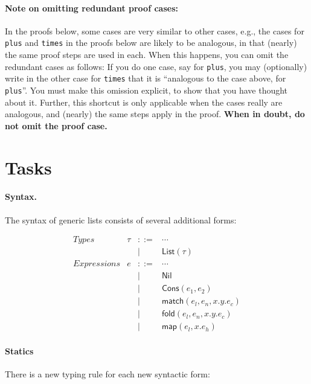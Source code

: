 \documentclass[11pt]{article}
\newcommand{\typ}[0]{\tau}
\newcommand{\List}[1]{\textsf{List}(#1)}
\begin{document}
\paragraph{Note on omitting redundant proof cases:} In the proofs below, some cases are very
similar to other cases, e.g., the cases for \texttt{plus} and
\texttt{times} in the proofs below are likely to be analogous, in that
(nearly) the same proof steps are used in each.
%
When this happens, you can omit the redundant cases as follows: If you
do one case, say for \texttt{plus}, you may (optionally) write in the
other case for \texttt{times} that it is ``analogous to the case
above, for \texttt{plus}''.  You must make this omission explicit, to
show that you have thought about it.  Further, this shortcut is only
applicable when the cases really are analogous, and (nearly) the same
steps apply in the proof.  \textbf{When in doubt, do not omit the
  proof case.}

\section*{Tasks}

\paragraph{Syntax.} The syntax of generic lists consists of several additional forms:

\[
\begin{array}{lllll}
Types &
\typ & ::= & \cdots
\\
    && | & \List{\typ}
\\[2mm]
Expressions &
e & ::= & \cdots 
\\
 &&|& \textsf{Nil}
\\
 &&|&      \textsf{Cons}(e_1, e_2)
\\
 &&|& \textsf{match}(e_l, e_n, x.y.e_c)
\\
 &&|& \textsf{fold}(e_l, e_n, x.y.e_c)
\\
 &&|& \textsf{map}(e_l, x.e_h)
\end{array}
\]

\paragraph{Statics} There is a new typing rule for each new syntactic form:
\end{document}
